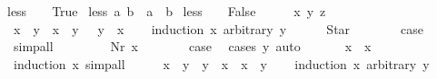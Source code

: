 \begin{isabellebody}
{\isachardoublequoteopen}less{\isacharunderscore}{\isasymM}\ {\isacharparenleft}\isactrlbold {\isacharunderscore}{\isacharparenright}\ \isactrlemph \ {\isacharequal}\ True{\isachardoublequoteclose}\ {\isacharbar}\isanewline
{\isachardoublequoteopen}less{\isacharunderscore}{\isasymM}\ {\isacharparenleft}\isactrlbold a{\isacharparenright}\ {\isacharparenleft}\isactrlbold b{\isacharparenright}\ {\isacharequal}\ {\isacharparenleft}a\ {\isacharless}\ b{\isacharparenright}{\isachardoublequoteclose}\ {\isacharbar}\isanewline
{\isachardoublequoteopen}less{\isacharunderscore}{\isasymM}\ {\isacharunderscore}\ {\isacharunderscore}\ {\isacharequal}\ False{\isachardoublequoteclose}\isanewline
\isanewline
{}\isamarkupfalse%
%
\isadelimproof
\ %
\endisadelimproof
%
\isatagproof
{}\isamarkupfalse%
\isanewline
\ \ \isamarkupfalse%
\ x\ y\ z\ {\isacharcolon}{\isacharcolon}\ {\isasymM}\isanewline
\ \ \isamarkupfalse%
\ {\isachardoublequoteopen}{\isacharparenleft}x\ {\isacharless}\ y{\isacharparenright}\ {\isacharequal}\ {\isacharparenleft}x\ {\isasymle}\ y\ {\isasymand}\ {\isasymnot}\ y\ {\isasymle}\ x{\isacharparenright}{\isachardoublequoteclose}\isanewline
\ \ \isamarkupfalse%
\ {\isacharparenleft}induction\ x\ arbitrary{\isacharcolon}\ y{\isacharparenright}\isanewline
\ \ \ \ \isamarkupfalse%
\ Star\isanewline
\ \ \ \ \isamarkupfalse%
\ \isamarkupfalse%
\ {\isacharquery}case\ \isamarkupfalse%
\ simp{\isacharunderscore}all\isanewline
\ \ \isamarkupfalse%
\isanewline
\ \ \ \ \isamarkupfalse%
\ {\isacharparenleft}Nr\ x{\isacharparenright}\isanewline
\ \ \ \ \isamarkupfalse%
\ \isamarkupfalse%
\ {\isacharquery}case\ \isamarkupfalse%
\ {\isacharparenleft}cases\ y{\isacharparenright}\ auto\isanewline
\ \ \isamarkupfalse%
\isanewline
\isanewline
\ \ \isamarkupfalse%
\ {\isachardoublequoteopen}x\ {\isasymle}\ x{\isachardoublequoteclose}\ \isamarkupfalse%
\ {\isacharparenleft}induction\ x{\isacharparenright}\ simp{\isacharunderscore}all\isanewline
\ \ \isamarkupfalse%
\ \isamarkupfalse%
\ {\isachardoublequoteopen}x\ {\isasymle}\ y\ {\isasymLongrightarrow}\ y\ {\isasymle}\ x\ {\isasymLongrightarrow}\ x\ {\isacharequal}\ y{\isachardoublequoteclose}\isanewline
\ \ \isamarkupfalse%
\ {\isacharparenleft}induction\ x\ arbitrary{\isacharcolon}\ y{\isacharparenright}\isanewline

\end{isabellebody}

